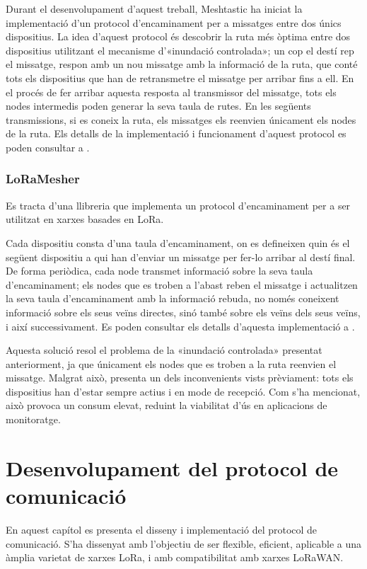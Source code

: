 \documentclass{tfgitic}[2024/07/01]
\begin{document}
Durant el desenvolupament d'aquest treball, Meshtastic ha iniciat la implementació d'un protocol d'encaminament per a missatges entre dos únics dispositius. La idea d'aquest protocol és descobrir la ruta més òptima entre dos dispositius utilitzant el mecanisme d'«inundació controlada»; un cop el destí rep el missatge, respon amb un nou missatge amb la informació de la ruta, que conté tots els dispositius que han de retransmetre el missatge per arribar fins a ell. En el procés de fer arribar aquesta resposta al transmissor del missatge, tots els nodes intermedis poden generar la seva taula de rutes. En les següents transmissions, si es coneix la ruta, els missatges els reenvien únicament els nodes de la ruta. Els detalls de la implementació i funcionament d'aquest protocol es poden consultar a \cite{open_source_mesh_nodate}.

\subsection{LoRaMesher}
Es tracta d'una llibreria que implementa un protocol d'encaminament per a ser utilitzat en xarxes basades en LoRa. 

Cada dispositiu consta d'una taula d'encaminament, on es defineixen quin és el següent dispositiu a qui han d'enviar un missatge per fer-lo arribar al destí final. De forma periòdica, cada node transmet informació sobre la seva taula d'encaminament; els nodes que es troben a l'abast reben el missatge i actualitzen la seva taula d'encaminament amb la informació rebuda, no només coneixent informació sobre els seus veïns directes, sinó també sobre els veïns dels seus veïns, i així successivament. Es poden consultar els detalls d'aquesta implementació a \cite{sole_implementation_2022}.

Aquesta solució resol el problema de la «inundació controlada» presentat anteriorment, ja que únicament els nodes que es troben a la ruta reenvien el missatge. Malgrat això, presenta un dels inconvenients vists prèviament: tots els dispositius han d'estar sempre actius i en mode de recepció. Com s'ha mencionat, això provoca un consum elevat, reduint la viabilitat d'ús en aplicacions de monitoratge.

\chapter{Desenvolupament del protocol de comunicació}
En aquest capítol es presenta el disseny i implementació del protocol de comunicació. S'ha dissenyat amb l'objectiu de ser flexible, eficient, aplicable a una àmplia varietat de xarxes LoRa, i amb compatibilitat amb xarxes LoRaWAN.
\end{document}

